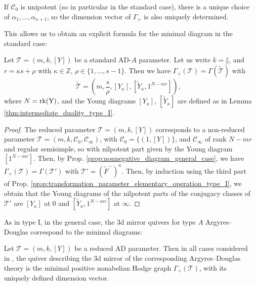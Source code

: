 \documentclass[11pt,a4paper]{amsart}
\numberwithin{equation}{section}
\begin{document}
\begin{remark}
If $\mathcal C_0$ is unipotent (so in particular in the standard case), there is a unique choice of $\alpha_1, \dots, \alpha_{\kappa+1}$, so the dimension vector of $\Gamma_+$ is also uniquely determined.
\end{remark}

This allows us to obtain an explicit formula for the minimal diagram in the standard case:

\begin{proposition}
\label{prop:explicit_nonnegative_diagram_general_case}
Let $\mathscr T=(m,k,[Y])$ be a standard AD-$A$ parameter. Let us write $k=\frac{s}{r}$, and $r=\kappa s+\rho$ with $\kappa\in \mathbb Z$, $\rho\in \{1, \dots, s-1\}$. Then we have $\Gamma_+(\mathscr T)=\Gamma(\widetilde{\mathcal T})$ with
\[
\widetilde{\mathcal T}=\left(m, \frac{s}{\rho}, [Y_\kappa], [\widetilde Y_\kappa, 1^{N-mr}]\right),
\]
where $N=\rm{rk}(Y)$, and the Young diagrams $[Y_\kappa]$, $[\widetilde Y_\kappa]$ are defined as in Lemma \ref{thm:intermediate_duality_type_I}.
\end{proposition}

\begin{proof}
The reduced parameter $\mathscr T=(m,k,[Y])$ corresponds to a non-reduced parameter $\mathscr T=(m,k,\mathcal C_0, \mathcal C_\infty)$, with $\mathcal C_0=\{(1, [Y])\}$, and $\mathcal C_\infty$ of rank $N-mr$ and regular semisimple, so with nilpotent part given by the Young diagram $[1^{N-mr}]$. Then, by Prop. \ref{prop:nonnegative_diagram_general_case}, we have $\Gamma_+(\mathcal T)=\Gamma(\mathcal T')$ with $\mathcal T'=(\widetilde{F}^-)^\kappa$. Then, by induction using the third part of Prop. \ref{prop:transformation_parameter_elementary_operation_type_I}, we obtain that the Young diagrams of the nilpotent parts of the conjugacy classes of $\mathcal T'$ are $[Y_\kappa]$ at $0$ and $[\widetilde Y_\kappa, 1^{N-mr}]$ at $\infty$.
\end{proof}

As in type I, in the general case, the 3d mirror quivers for type $A$ Argyres--Douglas correspond to the minimal diagrams:

\begin{proposition} 
\label{prop:3d_mirrors_are_nonneg_diagrams_gen_case}
Let $\mathscr T=(m,k, [Y])$ be a reduced AD parameter. Then in all cases considered in \cite{beem2025simplifying}, the quiver describing the 3d mirror of the corresponding Argyres--Douglas theory is the minimal positive nonabelian Hodge graph $\Gamma_+(\mathscr T)$, with its uniquely defined dimension vector. 
\end{proposition}
\end{document}
